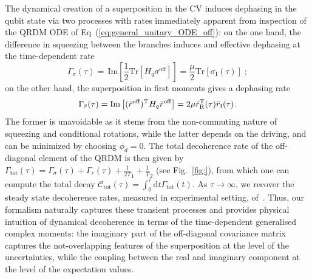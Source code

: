 \documentclass[%
reprint,
superscriptaddress,
nofootinbib,
 amsmath,amssymb,
prx,
floatfix,
]{revtex4-2}
\begin{document}
The dynamical creation of a superposition in the CV induces dephasing in the qubit state via two processes with rates immediately apparent from inspection of the QRDM ODE of Eq~(\ref{eq:general_unitary_ODE_off}): on the one hand, the difference in squeezing between the branches induces and effective dephasing at the time-dependent rate 
\begin{equation}
\Gamma_{\sigma}(\tau) =  \,\text{Im}\!\left[ \frac{1}{2}\text{Tr}\!\left[H_q \sigma^{\text{off}} \right] \right] = \frac{\mu}{2} \text{Tr} \left[ \sigma_\text{I} (\tau) \right]  \; ; \end{equation} 
on the other hand, the superposition in first moments gives a dephasing rate 
\begin{equation}
\Gamma_{\bar{r}} (\tau)= \text{Im}\left[ (\bar{r}^{\text{off}})^{\rm T}  H_q \bar{r}^{\text{off}} \right] = 2 \mu \bar{r}_{\text{R}}^{\rm T}(\tau) \bar{r}_{\text{I}}(\tau).
\end{equation}
The former is unavoidable as it stems from the non-commuting nature of squeezing and conditional rotations, while the latter depends on the driving, and can be minimized by choosing $\phi_d = 0$. The total decoherence rate of the off-diagonal element of the QRDM is then given by $\Gamma_{\text{tot}} (\tau) = \Gamma_{\sigma}(\tau) + \Gamma_{\bar{r}} (\tau) + \frac{1}{2 T}_1+\frac{1}{T}_2$ (see Fig.~\ref{fig:}), from which one can compute the total decay $\mathcal{C}_{\text{tot}} (\tau) = \int_{0}^\tau \text{d}t \Gamma_{\text{tot}} (t)$.  As $\tau \to \infty$, we recover the steady state decoherence rates, measured in experimental setting, of~\cite{eddins_high_2019}. Thus, our formalism naturally captures these transient processes and provides physical intuition of dynamical decoherence in terms of the time-dependent generalised complex moments: the imaginary part of the off-diagonal covariance matrix captures the not-overlapping features of the superposition at the level of the uncertainties, while the coupling between the real and imaginary component at the level of the expectation values. 





\end{document}
